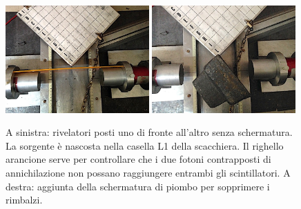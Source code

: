 \begin{figure}[h]
\centering
\subfloat
{\includegraphics[width=0.49\textwidth]{immagini/alter}\label{spostati}}
\hfill
\subfloat
{\includegraphics[width=0.49\textwidth]{immagini/spostati2}\label{spostati2}}
\caption{
A sinistra:
rivelatori posti uno di fronte all'altro senza schermatura.
La sorgente è nascosta nella casella L1 della scacchiera.
Il righello arancione serve per controllare che i due fotoni contrapposti di annichilazione
non possano raggiungere entrambi gli scintillatori.
A destra: aggiunta della schermatura di piombo per sopprimere i rimbalzi.}
\end{figure}

